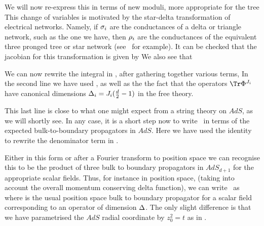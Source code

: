 We will now re-express this in terms of new moduli, more appropriate for the tree 
\eqn{}
This change of variables is motivated by the star-delta transformation 
of electrical 
networks. Namely, if ${\sigma}_i$ are the conductances of a delta or triangle network, 
such as the one we have, then ${\rho}_i$ are the conductances of the equivalent three 
pronged tree or star network (see \guil\ for example). 
It can be checked that the jacobian for this transformation is given by
\eqn{}
We also see that 
\eqn{}

We can now rewrite the integral in \thrcont , after gathering together 
various terms, 
\eqn{}
In the second line we have used \multp ,\multsol  
as well as the the fact that the 
operators $\Tr\P^{J_i}$ have canonical dimensions ${\Delta}_i=J_i({d \over 2}-1)$ in 
the free theory. 

This last line is close to what one might expect from a string theory on 
$AdS$, as we will shortly see. In any case, it is a short step now to write
\rhocont\ in terms of the expected bulk-to-boundary propagators in $AdS$.   
\eqn{}
Here we have used the identity 
\eqn{}
to rewrite the denominator term in \rhocont .

Either in this form or after a Fourier transform to position space we can 
recognise this to be the product of three bulk to boundary propagators in 
$AdS_{d+1}$ for the appropriate scalar fields. 
Thus, for instance in position space, (taking into account the overall 
momentum conserving delta function), we can write \btob\ as 
\eqn{}
where 
\eqn{}
is the usual position space bulk to boundary propagator for a scalar field 
corresponding to an operator of dimension ${\Delta}$. 
The only slight difference
is that we have parametrised the $AdS$ radial coordinate by $z_0^2=t$ as in \ff .


